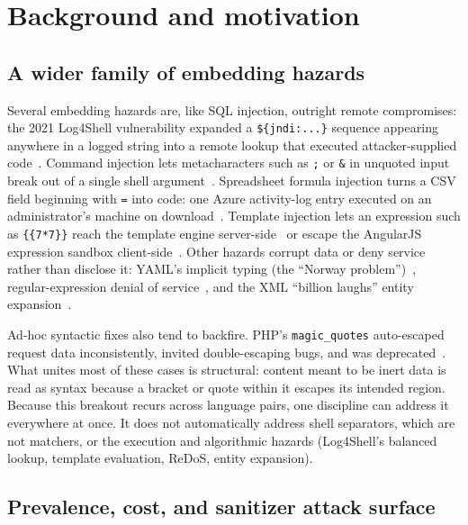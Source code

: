 \section{Background and motivation}
\label{sec:motivation}

\subsection{A wider family of embedding hazards}
\label{sec:bg:hazards}

Several embedding hazards are, like SQL injection, outright remote compromises: the 2021
Log4Shell vulnerability expanded a \verb|${jndi:...}| sequence appearing
anywhere in a logged string into a remote lookup that executed
attacker-supplied code~\cite{cve2021log4shell}. Command injection lets
metacharacters such as \verb|;| or \verb|&| in unquoted input break out of a
single shell argument~\cite{owasp_cmdinjection}. Spreadsheet formula injection
turns a CSV field beginning with \verb|=| into code: one Azure activity-log
entry executed on an administrator's machine on download~\cite{gietzen18csv}.
Template injection lets an expression such as \verb|{{7*7}}| reach the
template engine server-side~\cite{portswigger_ssti} or escape the AngularJS
expression sandbox client-side~\cite{peguero16angular}.
Other hazards corrupt data or deny service rather than disclose it: YAML's
implicit typing (the ``Norway problem'')~\cite{oconnor23yaml},
regular-expression denial of service~\cite{owasp_redos}, and the XML
``billion laughs'' entity expansion~\cite{sullivan09xml}.

Ad-hoc syntactic fixes also tend to backfire.
PHP's \verb|magic_quotes|
auto-escaped request data inconsistently, invited double-escaping bugs, and
was deprecated~\cite{php_magicquotes}. What unites most of these cases
is structural: content meant to be inert data is read as syntax because a
bracket or quote within it escapes its intended region. Because this breakout recurs
across language pairs, one discipline can address it everywhere at once.
It does not automatically address shell separators, which are not matchers,
or the execution and algorithmic hazards
(Log4Shell's balanced lookup, template evaluation, ReDoS, entity expansion).


\subsection{Prevalence, cost, and sanitizer attack surface}
\label{sec:bg:prevalence}

